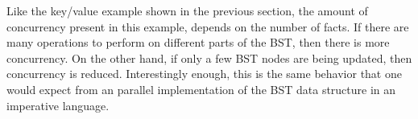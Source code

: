 Like the key/value example shown in the previous section, the amount of
concurrency present in this example, depends on the number of 
facts. If there are many  operations to perform on different parts
of the BST, then there is more concurrency. On the other hand, if only a few BST
nodes are being updated, then concurrency is reduced. Interestingly enough, this
is the same behavior that one would expect from an parallel implementation of
the BST data structure in an imperative language.
